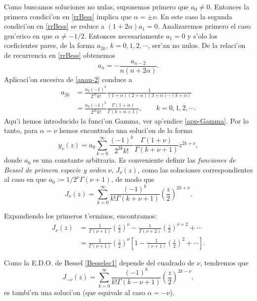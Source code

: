 Como buscamos soluciones no nulas, suponemos primero que $a_0\neq 0$. Entonces la primera condici'on en \eqref{rrBess} implica que $\alpha=\pm\nu$. En este caso la segunda condici'on en \eqref{rrBess} se reduce a $(1+2\alpha)a_1=0$. Analizaremos primero el caso gen'erico en que $\alpha\neq -1/2$. Entonces necesariamente $a_1=0$ y s'olo los coeficientes pares, de la forma $a_{2k}$, $k=0,1,2,\cdots$, ser'an no nulos. De la relaci'on de recurrencia en \eqref{rrBess} obtenemos
\begin{equation}\label{anan-2}
a_n=-\frac{a_{n-2}}{n(n+2\alpha)}.
\end{equation}
Aplicaci'on sucesiva de \eqref{anan-2} conduce a
\begin{align}
a_{2 k} &= \frac{a_0(-1)^k}{2^{2k}k!}\frac{1}{(1+\alpha)(2+\alpha)(3+\alpha)\cdots (k+\alpha)}\\
&= \frac{a_0 (-1)^k}{2^{2k} k!}\frac{\Gamma(1+\alpha)}{\Gamma(k +\alpha+ 1) }, \qquad k=0,1,2,\cdots. 
\end{align}
Aqu'i hemos introducido la funci'on Gamma, ver ap'endice \ref{app-Gamma}. Por lo tanto, para $\alpha=\nu$ hemos encontrado una soluci'on de la forma
\begin{equation}
y_\nu(z) = a_0 \sum_{k=0}^\infty \frac{(-1)^k}{2^{2k}k!}\frac{\Gamma(1+\nu)}{\Gamma(k+\nu+ 1) }
z^{2k+\nu},
\end{equation}
donde $a_0$ es una constante arbitraria. Es conveniente definir las \textit{funciones de Bessel de primera especie y orden} $\nu$, $J_\nu(z)$, como las soluciones correspondientes al caso en que $a_0:=1/2^{\nu}\Gamma(\nu+1)$, de modo que
\begin{equation}\label{Besselnu}
\boxed{J_\nu(z) = \sum_{k = 0}^\infty \frac{ (-1)^k }{ k! \Gamma(k + \nu + 1) }
\left( \frac{z}{2} \right)^{2k+\nu}.}
\end{equation}

Expandiendo los primeros t'erminos, encontramos:
\begin{align}\label{J-nu}
J_\nu(z) &= \frac{1}{\Gamma(\nu+1)}\left(\frac{z}{2}\right)^{\nu}
-\frac{1}{\Gamma(\nu+2)}\left(\frac{z}{2}\right)^{\nu+2}+ \cdots \\
&= \frac{1}{\Gamma(\nu+1)}\left(\frac{z}{2}\right)^{\nu}\left[1-\frac{1}{(\nu+1)}\left(\frac{z}{2}\right)^2+\cdots \right].
\end{align}



Como la E.D.O. de Bessel \eqref{Besselec1} depende del cuadrado de $\nu$, tendremos que 
\begin{equation}
J_{-\nu}(z) = \sum_{k = 0}^\infty \frac{ (-1)^k }{ k! \Gamma(k-\nu+1) }
\left( \frac{z}{2} \right)^{2k-\nu},
\end{equation}
es tambi'en una soluci'on (que equivale al caso $\alpha=-\nu$). 

